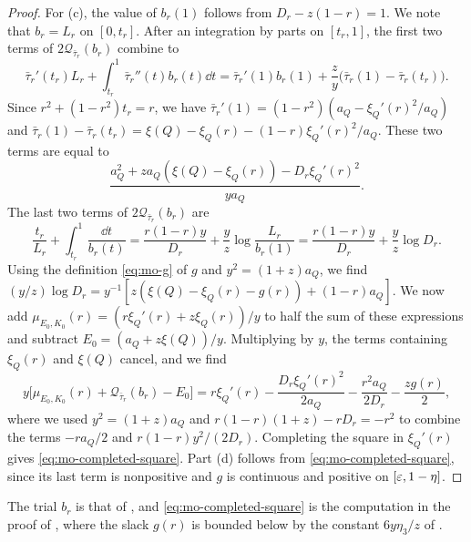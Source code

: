 \begin{proof}
For (c), the value of $b_r(1)$ follows from $D_r-z(1-r)=1$. We note that $b_r=L_r$ on $[0,t_r]$. After an integration by parts on $[t_r,1]$, the first two terms of $2\mathcal Q_{\bar\tau_r}(b_r)$ combine to
\[
\bar\tau_r'(t_r)L_r+\int_{t_r}^1\bar\tau_r''(t)b_r(t)\dd t=\bar\tau_r'(1)b_r(1)+\frac zy\bigl(\bar\tau_r(1)-\bar\tau_r(t_r)\bigr).
\]
Since $r^2+(1-r^2)t_r=r$, we have $\bar\tau_r'(1)=(1-r^2)(a_Q-\xi_Q'(r)^2/a_Q)$ and $\bar\tau_r(1)-\bar\tau_r(t_r)=\xi(Q)-\xi_Q(r)-(1-r)\xi_Q'(r)^2/a_Q$. These two terms are equal to
\[
\frac{a_Q^2+za_Q(\xi(Q)-\xi_Q(r))-D_r\xi_Q'(r)^2}{ya_Q}.
\]
The last two terms of $2\mathcal Q_{\bar\tau_r}(b_r)$ are
\[
\frac{t_r}{L_r}+\int_{t_r}^1\frac{\dd t}{b_r(t)}=\frac{r(1-r)y}{D_r}+\frac yz\log\frac{L_r}{b_r(1)}=\frac{r(1-r)y}{D_r}+\frac yz\log D_r.
\]
Using the definition \eqref{eq:mo-g} of $g$ and $y^2=(1+z)a_Q$, we find $(y/z)\log D_r=y^{-1}[z(\xi(Q)-\xi_Q(r)-g(r))+(1-r)a_Q]$. We now add $\mu_{E_0,K_0}(r)=(r\xi_Q'(r)+z\xi_Q(r))/y$ to half the sum of these expressions and subtract $E_0=(a_Q+z\xi(Q))/y$. Multiplying by $y$, the terms containing $\xi_Q(r)$ and $\xi(Q)$ cancel, and we find
\[
y\bigl[\mu_{E_0,K_0}(r)+\mathcal Q_{\bar\tau_r}(b_r)-E_0\bigr]=r\xi_Q'(r)-\frac{D_r\xi_Q'(r)^2}{2a_Q}-\frac{r^2a_Q}{2D_r}-\frac{zg(r)}2,
\]
where we used $y^2=(1+z)a_Q$ and $r(1-r)(1+z)-rD_r=-r^2$ to combine the terms $-ra_Q/2$ and $r(1-r)y^2/(2D_r)$. Completing the square in $\xi_Q'(r)$ gives \eqref{eq:mo-completed-square}. Part (d) follows from \eqref{eq:mo-completed-square}, since its last term is nonpositive and $g$ is continuous and positive on $[\varepsilon,1-\eta]$.
\end{proof}

The trial $b_r$ is that of \cite[Eq.~(3.13)]{HuangSellke2024}, and \eqref{eq:mo-completed-square} is the computation in the proof of \cite[Proposition~3.13]{HuangSellke2024}, where the slack $g(r)$ is bounded below by the constant $6y\eta_3/z$ of \cite[Eq.~(3.5)]{HuangSellke2024}.

